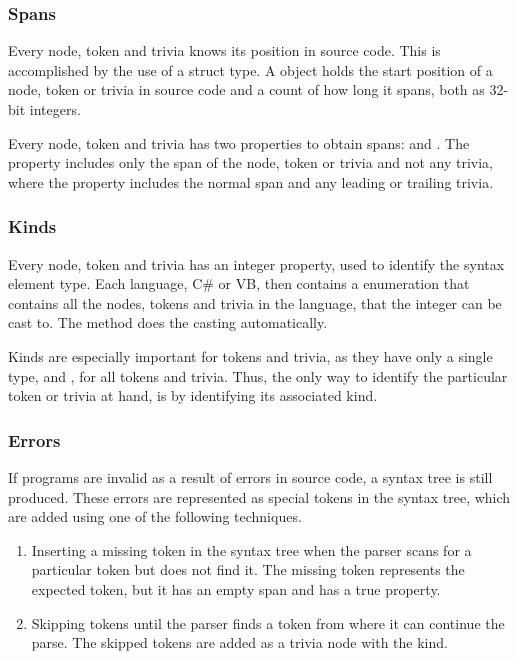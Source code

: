 \subsubsection{Spans}
Every node, token and trivia knows its position in source code. This is accomplished by the use of a  struct type. A  object holds the start position of a node, token or trivia in source code and a count of how long it spans, both as 32-bit integers\cite[p. 8]{ng2012roslyn}.

Every node, token and trivia has two properties to obtain spans:  and . The  property includes only the span of the node, token or trivia and not any trivia, where the  property includes the normal span and any leading or trailing trivia.  

\subsubsection{Kinds}
\label{subsubsec:roslyn_kinds}
Every node, token and trivia has an integer  property, used to identify the syntax element type. Each language, C\# or \ac{VB}, then contains a  enumeration that contains all the nodes, tokens and trivia in the language, that the integer can be cast to. The  method does the casting automatically\cite{roslynwikiOverview}\cite[p. 9]{ng2012roslyn}.

Kinds are especially important for tokens and trivia, as they have only a single type,  and , for all tokens and trivia. Thus, the only way to identify the particular token or trivia at hand, is by identifying its associated kind.

\subsubsection{Errors}
If programs are invalid as a result of errors in source code, a syntax tree is still produced. These errors are represented as special tokens in the syntax tree, which are added using one of the following techniques\cite[p. 9]{ng2012roslyn}.
\begin{enumerate}
\item Inserting a missing token in the syntax tree when the parser scans for a particular token but does not find it. The missing token represents the expected token, but it has an empty span and has a true  property.
\item Skipping tokens until the parser finds a token from where it can continue the parse. The skipped tokens are added as a trivia node with the  kind.
\end{enumerate}

